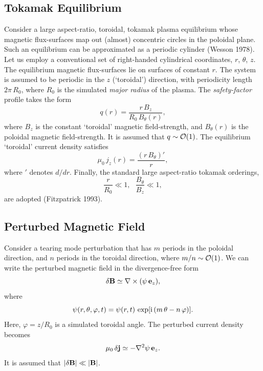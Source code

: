 \documentclass[notitlepage,12pt]{article}
\begin{document}
\subsection{Tokamak Equilibrium}
Consider a large aspect-ratio, toroidal,  tokamak plasma equilibrium whose magnetic flux-surfaces map out (almost) concentric circles in the poloidal plane. Such an equilibrium can be approximated as a periodic cylinder (Wesson 1978). 
Let us employ a conventional set of right-handed cylindrical coordinates, $r$, $\theta$, $z$. The
equilibrium magnetic flux-surfaces lie on surfaces of constant $r$. The system is
assumed to be periodic in the $z$ (`toroidal') direction, with periodicity length $2\pi\,R_0$, 
where $R_0$ is the simulated {\em major radius}\/ of the plasma. The {\em safety-factor}\/ profile takes the form
\begin{equation}\label{e90}
q(r)= \frac{r\,B_z}{R_0\,B_\theta(r)},
\end{equation}
where $B_z$ is the constant `toroidal' magnetic field-strength, and $B_\theta(r)$ is
the poloidal magnetic field-strength. It is assumed that $q\sim{\cal O}(1)$. 
The equilibrium `toroidal' current density
satisfies
\begin{equation}
\mu_0\,j_z(r) = \frac{(r\,B_\theta)'}{r},
\end{equation}
where $'$ denotes $d/dr$. Finally, the standard large aspect-ratio
tokamak orderings,  
\begin{equation}\label{e92}
\frac{r}{R_0}\ll 1,~~~ \frac{B_\theta}{B_z}\ll 1,
\end{equation}
are adopted (Fitzpatrick 1993). 

\subsection{Perturbed Magnetic Field}
Consider a tearing mode perturbation that has $m$ periods in the poloidal direction,
and $n$ periods in the toroidal direction, where $m/n\sim {\cal O}(1)$.  We can write the perturbed magnetic field in the divergence-free form
\begin{equation}\label{e93}
\delta{\bf B} \simeq \nabla\times (\psi\,{\bf e}_z),
\end{equation}
where
\begin{equation}\label{e93a}
\psi(r,\theta,\varphi,t)= \psi(r,t)\,\exp[{\rm i}\,(m\,\theta-n\,\varphi)].
\end{equation}
Here, $\varphi=z/R_0$ is a simulated toroidal angle. The perturbed current density becomes
\begin{equation}\label{e94}
\mu_0\,\delta {\bf j} \simeq - \nabla^2\psi\,{\bf e}_z.
\end{equation}
It is assumed that $|\delta{\bf B}|\ll |{\bf B}|$. 
\end{document}

